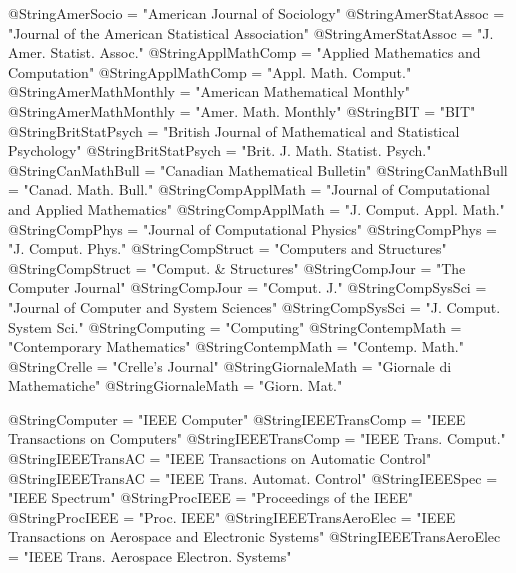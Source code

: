  @String{AmerSocio = "American Journal of Sociology" }
 @String{AmerStatAssoc = "Journal of the American Statistical Association" }
 @String{AmerStatAssoc = "J. Amer. Statist. Assoc." }
 @String{ApplMathComp = "Applied Mathematics and Computation" }
 @String{ApplMathComp = "Appl. Math. Comput." }
 @String{AmerMathMonthly = "American Mathematical Monthly" }
 @String{AmerMathMonthly = "Amer. Math. Monthly" }
 @String{BIT = "{BIT}" }
 @String{BritStatPsych = "British Journal of Mathematical and Statistical
          Psychology" }
 @String{BritStatPsych = "Brit. J. Math. Statist. Psych." }
 @String{CanMathBull = "Canadian Mathematical Bulletin" }
 @String{CanMathBull = "Canad. Math. Bull." }
 @String{CompApplMath = "Journal of Computational and Applied Mathematics" }
 @String{CompApplMath = "J. Comput. Appl. Math." }
 @String{CompPhys = "Journal of Computational Physics" }
 @String{CompPhys = "J. Comput. Phys." }
 @String{CompStruct = "Computers and Structures" }
 @String{CompStruct = "Comput. \& Structures" }
 @String{CompJour = "The Computer Journal" }
 @String{CompJour = "Comput. J." }
 @String{CompSysSci = "Journal of Computer and System Sciences" }
 @String{CompSysSci = "J. Comput. System Sci." }
 @String{Computing = "Computing" }
 @String{ContempMath = "Contemporary Mathematics" }
 @String{ContempMath = "Contemp. Math." }
 @String{Crelle = "Crelle's Journal" }
 @String{GiornaleMath = "Giornale di Mathematiche" }
 @String{GiornaleMath = "Giorn. Mat." } %

 @String{Computer = "{IEEE} Computer" }
 @String{IEEETransComp = "{IEEE} Transactions on Computers" }
 @String{IEEETransComp = "{IEEE} Trans. Comput." }
 @String{IEEETransAC = "{IEEE} Transactions on Automatic Control" }
 @String{IEEETransAC = "{IEEE} Trans. Automat. Control" }
 @String{IEEESpec = "{IEEE} Spectrum" } %
 @String{ProcIEEE = "Proceedings of the {IEEE}" }
 @String{ProcIEEE = "Proc. {IEEE}" } %
 @String{IEEETransAeroElec = "{IEEE} Transactions on Aerospace and Electronic
     Systems" }
 @String{IEEETransAeroElec = "{IEEE} Trans. Aerospace Electron. Systems" }

